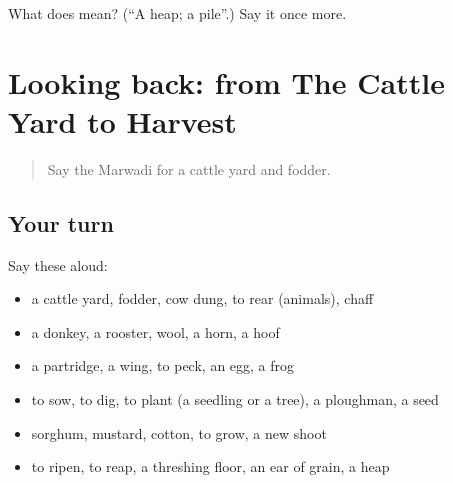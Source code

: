\begin{tcolorbox}[breakable,colback=teal!4,colframe=teal!35!black,title={Before you move on}]
What does  mean? (\textquotedblleft{}A heap; a pile\textquotedblright{}.) Say it once more.
\end{tcolorbox}
\section[(dialogue)]{Looking back: from The Cattle Yard to Harvest}

\label{lesson:MW-R240-review-235-240}



\begin{quote}
Say the Marwadi for a cattle yard and fodder.
\end{quote}

\subsection*{Your turn}
Say these aloud:

\begin{itemize}
\raggedright
  \item a cattle yard, fodder, cow dung, to rear (animals), chaff
  \item a donkey, a rooster, wool, a horn, a hoof
  \item a partridge, a wing, to peck, an egg, a frog
  \item to sow, to dig, to plant (a seedling or a tree), a ploughman, a seed
  \item sorghum, mustard, cotton, to grow, a new shoot
  \item to ripen, to reap, a threshing floor, an ear of grain, a heap
\end{itemize}

